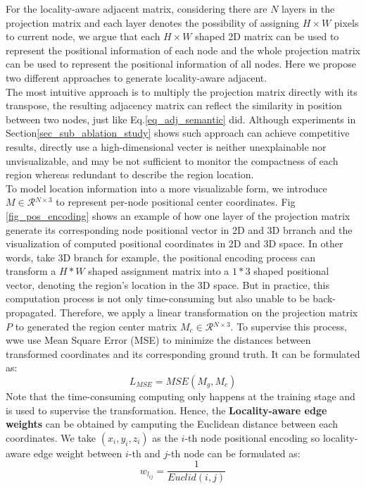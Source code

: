 \documentclass[journal]{IEEEtran}
\begin{document}
    For the locality-aware adjacent matrix, considering there are $N$ layers in the projection matrix and each layer denotes the possibility of assigning $H \times W$ pixels to current node, we argue that each $H \times W$ shaped 2D matrix can be used to represent the positional information of each node and the whole projection matrix can be used to represent the positional information of all nodes. Here we propose two different approaches to generate locality-aware adjacent. \\
    
    The most intuitive approach is to multiply the projection matrix directly with its transpose, the resulting adjacency matrix can reflect the similarity in position between two nodes, just like Eq.\ref{eq_adj_semantic} did. Although experiments in Section\ref{sec_sub_ablation_study} shows such approach can achieve competitive results, directly use a high-dimensional vecter is neither unexplainable nor unvisualizable, and may be not sufficient to monitor the compactness of each region whereas redundant to describe the region location. \\
    
    To model location information into a more visualizable form, we introduce $M \in \mathcal{R}{^{N\times 3}}$ to represent per-node positional center coordinates. Fig \ref{fig_pos_encoding} shows an example of how one layer of the projection matrix generate its corresponding node positional vector in 2D and 3D brranch and the visualization of computed positional coordinates in 2D and 3D space. In other words, take 3D branch for example, the positional encoding process can transform a $H*W$ shaped assignment matrix into a $1*3$ shaped positional vector, denoting the region's location in the 3D space. But in practice, this computation process is not only time-consuming but also unable to be back-propagated. Therefore, we apply a linear transformation on the projection matrix $P$ to generated the region center matrix ${M}_{c} \in \mathcal{R}{^{N\times 3}}$. To supervise this process, wwe use Mean Square Error (MSE) to minimize the distances between transformed coordinates and its corresponding ground truth. It can be formulated as:
    \begin{equation}\label{loss_mse}
    L_{MSE} = MSE(M_g, M_c)
    \end{equation} 
    Note that the time-consuming computing only happens at the training stage and is used to supervise the transformation. Hence, the \textbf{Locality-aware edge weights} can be obtained by camputing the Euclidean distance between each coordinates. We take $(x_i, y_i, z_i)$ as the $i$-th node positional encoding so locality-aware edge weight between $i$-th and $j$-th node can be formulated as:
    \begin{equation}
        w_{l_{ij}} = \frac{1}{Euclid(i, j)}
    \end{equation} 
\end{document}
